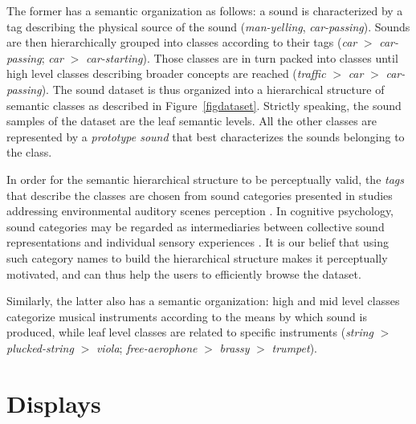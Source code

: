 \documentclass{aes2e}
\begin{document}
The former has a semantic organization as follows: a sound is characterized by a tag describing the physical source of the sound (\textit{man-yelling}, \textit{car-passing}). Sounds are then hierarchically grouped into classes according to their tags (\textit{car} $>$ \textit{car-passing}; \textit{car} $>$ \textit{car-starting}). Those classes are in turn packed into classes until high level classes describing broader concepts are reached (\textit{traffic} $>$ \textit{car} $>$ \textit{car-passing}). The sound dataset is thus organized into a hierarchical structure of semantic classes as described in Figure~\ref{figdataset}. Strictly speaking, the sound samples of the dataset are the leaf semantic levels. All the other classes are represented by a \textit{prototype sound} that best characterizes the sounds belonging to the class. 

In order for the semantic hierarchical structure to be perceptually valid, the \textit{tags} that describe the classes  are chosen from sound categories presented in studies addressing environmental auditory scenes perception \cite{niessen2010categories, brown2011towards, dubois2006cognitive}. In cognitive psychology, sound categories may be regarded as intermediaries between collective sound representations and individual sensory experiences \cite{dubois2006cognitive}. It is our belief that using such category names to build the hierarchical structure makes it perceptually motivated, and can thus help the users to efficiently browse the dataset.

Similarly, the latter also has a semantic organization: high and mid level classes categorize musical instruments according to the means by which sound is produced, while leaf level classes are related to specific instruments (\textit{string} $>$ \textit{plucked-string} $>$ \textit{viola}; \textit{free-aerophone} $>$ \textit{brassy} $>$ \textit{trumpet}).


\section{Displays} \label{display}
\end{document}
